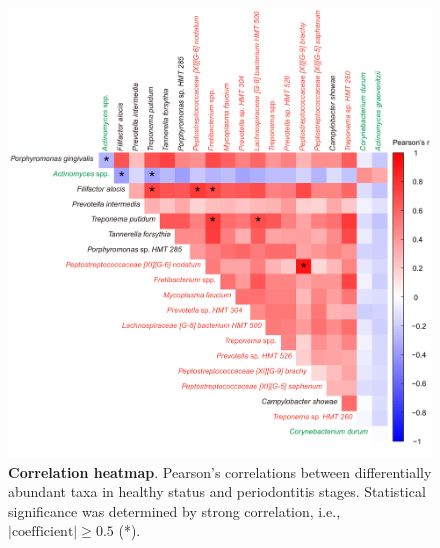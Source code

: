 \documentclass[11pt, a4paper, onecolumn, oneside]{report}
\begin{document}
            \begin{figure}[p]
                \centering
                \includegraphics[width=12 cm]{Figures/Periodontitis/Figure_3.pdf}
                \caption[Correlation heatmap]{\textbf{Correlation heatmap}. Pearson’s correlations between differentially abundant taxa in healthy status and periodontitis stages. Statistical significance was determined by strong correlation, i.e., $| \textrm{coefficient} | \ge 0.5$ (*).}
                \label{fig:Periodontitis-correlation}
            \end{figure}
            \clearpage
\end{document}
